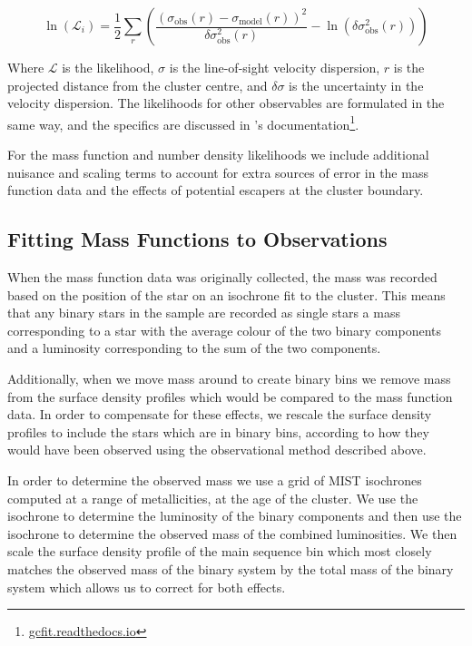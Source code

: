 \begin{equation}
	\ln \left(\mathcal{L}_{i}\right)=\frac{1}{2}
	\sum_{r}\left(\frac{\left(\sigma_{\mathrm{obs}}(r)
		-\sigma_{\mathrm{model}}(r)\right)^{2}}{\delta \sigma_{\mathrm{obs}}^{2}(r)}
	-\ln \left(\delta \sigma_{\mathrm{obs}}^{2}(r)\right)\right)
\end{equation}

Where $\mathcal{L}$ is the likelihood, $\sigma$ is the line-of-sight velocity dispersion, $r$ is the
projected distance from the cluster centre, and $\delta \sigma$ is the uncertainty in the velocity
dispersion. The likelihoods for other observables are formulated in the same way, and the specifics
are discussed in 's documentation\footnote{\url{gcfit.readthedocs.io}}.

For the mass function and number density likelihoods we include additional nuisance and scaling
terms to account for extra sources of error in the mass function data and the effects of potential
escapers at the cluster boundary.




\subsection{Fitting Mass Functions to Observations}

When the mass function data was originally collected, the mass was recorded based on the position of
the star on an isochrone fit to the cluster. This means that any binary stars in the sample are
recorded as single stars a mass corresponding to a star with the average colour of the two binary
components and a luminosity corresponding to the sum of the two components.

Additionally, when we move mass around to create binary bins we remove mass from the surface density
profiles which would be compared to the mass function data. In order to compensate for these
effects, we rescale the surface density profiles to include the stars which are in binary bins,
according to how they would have been observed using the observational method described above.

In order to determine the observed mass we use a grid of MIST isochrones computed at a range of
metallicities, at the age of the cluster. We use the isochrone to determine the luminosity of the
binary components and then use the isochrone to determine the observed mass of the combined
luminosities. We then scale the surface density profile of the main sequence bin which most closely
matches the observed mass of the binary system by the total mass of the binary system which allows
us to correct for both effects.